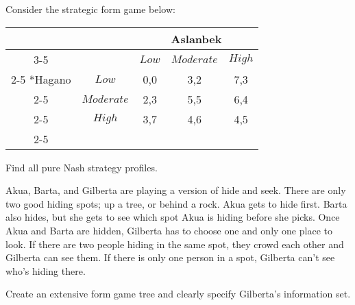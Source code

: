 \documentclass{article}
\begin{document}
\newpage


\begin{question}
Consider the strategic form game below:

\begin{table}[h!]
  \begin{center}
  \begin{tabular}{*{5}{c|}}
    \multicolumn{2}{c}{} & \multicolumn{3}{c}{Aslanbek} \\\cline{3-5}
    \multicolumn{1}{c}{} & & $Low$ & $Moderate$ & $High$ \\\cline{2-5}
    \multirow{3}*{Hagano}  & $Low$ & 0,0 & 3,2 & 7,3 \\\cline{2-5}
                         & $Moderate$ & 2,3 & 5,5 & 6,4 \\\cline{2-5}
                         & $High$ & 3,7 & 4,6 & 4,5 \\ \cline{2-5}
  \end{tabular}
  \end{center}
\end{table}

Find all pure Nash strategy profiles.

\vspace{40mm}
\end{question}


\begin{question}
Akua, Barta, and Gilberta are playing a version of hide and seek.
There are only two good hiding spots;
up a tree, or behind a rock.
Akua gets to hide first.
Barta also hides, but she gets to see which spot Akua is hiding
before she picks.
Once Akua and Barta are hidden,
Gilberta has to choose one and only one place to look.
If there are two people hiding in the same spot, 
they crowd each other and Gilberta can see them.
If there is only one person in a spot, Gilberta can't see 
who's hiding there.

Create an extensive form game tree
and clearly specify Gilberta's information set.

\end{question}
\newpage

\end{document}
